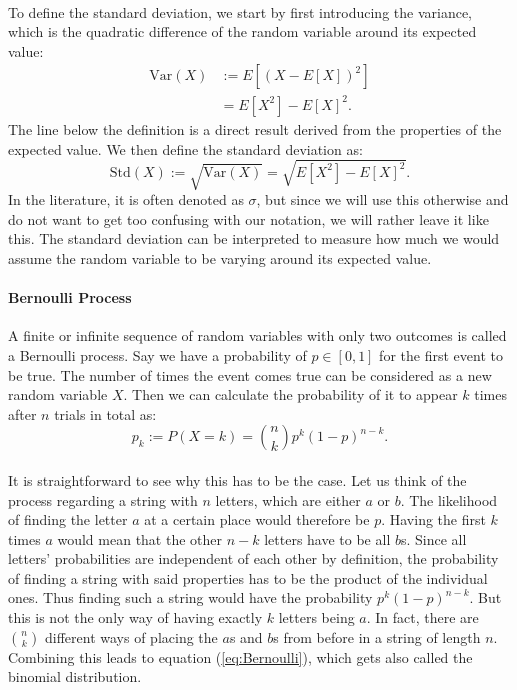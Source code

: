 \paragraph*{}
To define the standard deviation, we start by first introducing the variance, which is the quadratic difference of the random variable around its expected value:
\begin{equation}\label{eq:variance}
\begin{split}
\text{Var}(X) &:= E[\left(X-E[X]\right)^2]\\
&= E[X^2] - E[X]^2.
\end{split}
\end{equation}
The line below the definition is a direct result derived from the properties of the expected value. We then define the standard deviation as:
\begin{equation}\label{eq:standard_deviation}
\text{Std}(X):= \sqrt{\text{Var}(X)} = \sqrt{E[X^2] - E[X]^2}.
\end{equation}
In the literature, it is often denoted as $\sigma$, but since we will use this otherwise and do not want to get too confusing with our notation, we will rather leave it like this. The standard deviation can be interpreted to measure how much we would assume the random variable to be varying around its expected value.

\paragraph*{Bernoulli Process}\label{sec:bernoulli_process}
A finite or infinite sequence of random variables with only two outcomes is called a Bernoulli process. Say we have a probability of $p \in [0,1]$ for the first event to be true. The number of times the event comes true can be considered as a new random variable $ X $. Then we can calculate the probability of it to appear $k$ times after $n$ trials in total as:
\begin{equation}\label{eq:Bernoulli}
p_k := P(X=k) = {n\choose k} p^k(1-p)^{n-k}.
\end{equation}

\paragraph*{}
It is straightforward to see why this has to be the case. Let us think of the process regarding a string with $n$ letters, which are either $a$ or $b$. The likelihood of finding the letter $a$ at a certain place would therefore be $p$. Having the first $k$ times $a$ would mean that the other $n-k$ letters have to be all $b$s. Since all letters' probabilities are independent of each other by definition, the probability of finding a string with said properties has to be the product of the individual ones. Thus finding such a string would have the probability $p^k(1-p)^{n-k}$. But this is not the only way of having exactly $k$ letters being $a$. In fact, there are ${n\choose k}$ different ways of placing the $a$s and $b$s from before in a string of length $n$. Combining this leads to equation (\ref{eq:Bernoulli}), which gets also called the binomial distribution.

